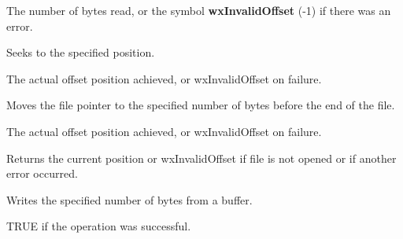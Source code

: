 

The number of bytes read, or the symbol {\bf wxInvalidOffset} (-1) if there was an error.

\label{wxfileseek}


Seeks to the specified position.





The actual offset position achieved, or wxInvalidOffset on failure.

\label{wxfileseekend}


Moves the file pointer to the specified number of bytes before the end of the file.




The actual offset position achieved, or wxInvalidOffset on failure.

\label{wxfiletell}


Returns the current position or wxInvalidOffset if file is not opened or if another
error occurred.

\label{wxfilewrite}


Writes the specified number of bytes from a buffer.





TRUE if the operation was successful.


